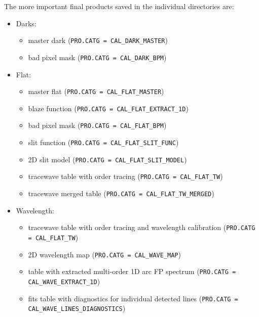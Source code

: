 The more important final products saved in the individual directories are: 
\begin{itemize}

\item Darks: 
\begin{itemize}
\item master dark ({\tt PRO.CATG = CAL\_DARK\_MASTER})
\item bad pixel mask ({\tt PRO.CATG = CAL\_DARK\_BPM})
\end{itemize}

\item Flat: 
\begin{itemize}
\item master flat ({\tt PRO.CATG = CAL\_FLAT\_MASTER})
\item blaze function ({\tt PRO.CATG = CAL\_FLAT\_EXTRACT\_1D})
\item bad pixel mask ({\tt PRO.CATG = CAL\_FLAT\_BPM})
\item slit function ({\tt PRO.CATG = CAL\_FLAT\_SLIT\_FUNC})
\item 2D slit model ({\tt PRO.CATG = CAL\_FLAT\_SLIT\_MODEL})
\item tracewave table with order tracing ({\tt PRO.CATG = CAL\_FLAT\_TW})
\item tracewave merged table ({\tt PRO.CATG = CAL\_FLAT\_TW\_MERGED})
\end{itemize}

\item Wavelength: 
\begin{itemize}
\item tracewave table with order tracing and wavelength calibration ({\tt PRO.CATG = CAL\_FLAT\_TW})
\item 2D wavelength map ({\tt PRO.CATG = CAL\_WAVE\_MAP})
\item table with extracted multi-order 1D arc FP spectrum ({\tt PRO.CATG = CAL\_WAVE\_EXTRACT\_1D})
\item fits table with diagnostics for individual detected lines ({\tt PRO.CATG =\\ CAL\_WAVE\_LINES\_DIAGNOSTICS})
\end{itemize}


\end{itemize}
